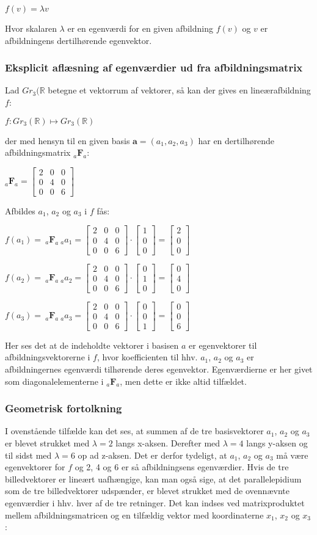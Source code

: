 \documentclass{article}
\newcommand{\cent}[1]{\begin{center}#1\end{center}}
\newcommand{\afb}[3]{\ensuremath{_#1 \textbf{#2}_#3}}
\newcommand{\vek}[3]{\ensuremath{\begin{bmatrix} #1\\ #2\\ #3\end{bmatrix}}}
\newcommand{\mediumMatrix}[9]{\ensuremath{
		\begin{bmatrix}
			#1 & #2 & #3 \\
			#4 & #5 & #6 \\
			#7 & #8 & #9
		\end{bmatrix}}}
\begin{document}
	\cent{$ f(v)=\lambda v $}
	
	Hvor skalaren $\lambda$ er en egenværdi for en given afbildning $f(v)$ og $v$ er afbildningens dertilhørende egenvektor. 
	
	\subsubsection{Eksplicit aflæsning af egenværdier ud fra afbildningsmatrix}
	
	
	Lad $Gr_3(\mathbb{R}$ betegne et vektorrum af vektorer, så kan der gives en lineærafbildning $f$:
	
	\cent{$f : Gr_3(\mathbb{R})\mapsto Gr_3(\mathbb{R})$ }
	
	der med hensyn til en given basis $\textbf{a}=(a_1,a_2,a_3)$ har en dertilhørende afbildningsmatrix \afb{a}{F}{a}:
	
	\cent{$ \afb{a}{F}{a} = \mediumMatrix{2}{0}{0}{0}{4}{0}{0}{0}{6} $}
	Afbildes $a_1$, $a_2$ og $a_3$ i $f$ fås:
	
	\cent{$ f(a_1)=\ \afb{a}{F}{a} \ _a a_1 = \mediumMatrix{2}{0}{0}{0}{4}{0}{0}{0}{6} \cdot \vek{1}{0}{0} = \vek{2}{0}{0} $}
	\cent{$ f(a_2)=\ \afb{a}{F}{a} \ _a a_2 = \mediumMatrix{2}{0}{0}{0}{4}{0}{0}{0}{6} \cdot \vek{0}{1}{0} = \vek{0}{4}{0} $}	
	\cent{$ f(a_3)=\ \afb{a}{F}{a} \ _a a_3 = \mediumMatrix{2}{0}{0}{0}{4}{0}{0}{0}{6} \cdot \vek{0}{0}{1} = \vek{0}{0}{6} $}
	
	Her ses det at de indeholdte vektorer i basisen $a$ er egenvektorer til afbildningsvektorerne i $f$, hvor koefficienten til hhv. $a_1$, $a_2$ og $a_3$ er afbildningernes egenværdi tilhørende deres egenvektor. Egenværdierne er her givet som diagonalelementerne i \afb{a}{F}{a}, men dette er ikke altid tilfældet.
	
	\subsubsection{Geometrisk fortolkning}
	I ovenstående tilfælde kan det ses, at summen af de tre basisvektorer $ a_1 $, $ a_2 $ og $ a_3 $ er blevet strukket med $\lambda=2$ langs x-aksen. Derefter med $\lambda=4$ langs y-aksen og til sidst med $\lambda=6$ op ad z-aksen. Det er derfor tydeligt, at $a_1$, $a_2$ og $a_3$ må være egenvektorer for $f$ og 2, 4 og 6 er så afbildningsens egenværdier.
	Hvis de tre billedvektorer er lineært uafhængige, kan man også sige, at det parallelepidium som de tre billedvektorer udspænder, er blevet strukket med de ovennævnte egenværdier i hhv. hver af de tre retninger. Det kan indses ved matrixproduktet mellem afbildningsmatricen og en tilfældig vektor med koordinaterne $x_1$, $x_2$ og $x_3$: 
	
\end{document}
